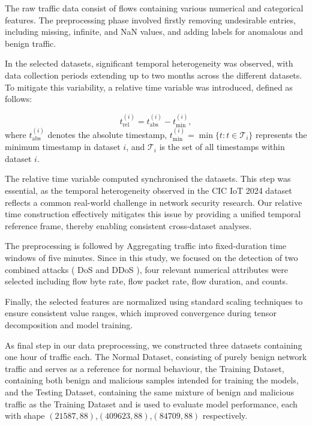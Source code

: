 \documentclass{ieeeaccess}
\begin{document}
The raw traffic data consist of flows containing various numerical and categorical features. The preprocessing phase involved firstly removing undesirable entries, including missing, infinite, and NaN values, and adding labels for anomalous and benign traffic.

In the selected datasets, significant temporal heterogeneity was observed, with data collection periods extending up to two months across the different datasets. To mitigate this variability, a relative time variable was introduced, defined as follows:

\begin{equation}
t_{\text{rel}}^{(i)} = t_{\text{abs}}^{(i)} - t_{\min}^{(i)},
\end{equation}
\noindent where $t_{\text{abs}}^{(i)}$ denotes the absolute timestamp, $t_{\min}^{(i)} = \min\{t : t \in \mathcal{T}_i\}$ represents the minimum timestamp in dataset $i$, and $\mathcal{T}_i$ is the set of all timestamps within dataset $i$. 

The relative time variable computed synchronised the datasets. This step was essential, as the temporal heterogeneity observed in the CIC IoT 2024 dataset reflects a common real-world challenge in network security research. Our relative time construction effectively mitigates this issue by providing a unified temporal reference frame, thereby enabling consistent cross-dataset analyses.

The preprocessing is followed by Aggregating traffic into fixed-duration time windows of five minutes. Since in this study, we focused on the detection of two combined attacks ( DoS and DDoS ), four relevant numerical attributes were selected including flow byte rate, flow packet rate, flow duration, and counts. 

Finally, the selected features are normalized using standard scaling techniques to ensure consistent value ranges, which improved convergence during tensor decomposition and model training.

As  final step in our data preprocessing, we constructed three datasets containing one hour of traffic each. The Normal Dataset, consisting of purely benign network traffic and serves as a reference for normal behaviour, the Training Dataset, containing both benign and malicious samples intended for training the models, and the Testing Dataset, containing the same mixture of benign and malicious traffic as the Training Dataset and is used to evaluate model performance, each with shape  $(21587, 88)$,$(409623, 88)$,$
(84709, 88)$ respectively. 
\end{document}
